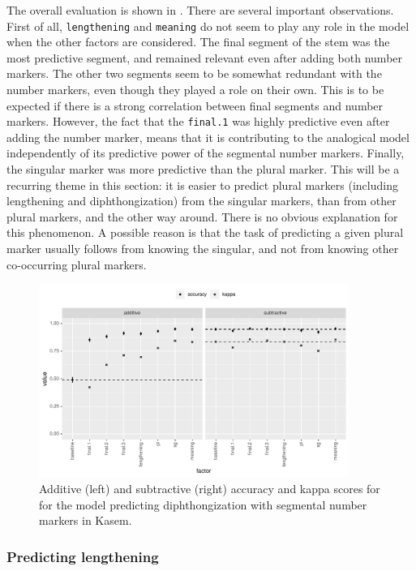 The overall evaluation is shown in . There are several important observations. First of all, \texttt{lengthening} and \texttt{meaning} do not seem to play any role in the model when the other factors are considered. The final segment of the stem was the most predictive segment, and remained relevant even after adding both number markers. The other two segments seem to be somewhat redundant with the number markers, even though they played a role on their own. This is to be expected if there is a strong correlation between final segments and number markers. However, the fact that the \texttt{final.1} was highly predictive even after adding the number marker, means that it is contributing to the analogical model independently of its predictive power of the segmental number markers. Finally, the singular marker was more predictive than the plural marker. This will be a recurring theme in this section: it is easier to predict plural markers (including lengthening and diphthongization) from the singular markers, than from other plural markers, and the other way around. There is no obvious explanation for this phenomenon. A possible reason is that the task of predicting a given plural marker usually follows from knowing the singular, and not from knowing other co-occurring plural markers.

\begin{figure}[!htpb]
  \centering
  \includegraphics[width=0.9\textwidth]{./figures/kasem/p-fi-dp-sg-overall.pdf}
  \caption{Additive (left) and subtractive (right) accuracy and kappa scores for for the model predicting diphthongization with segmental number markers in Kasem.}\label{fig:overall-fi-dp}
\end{figure}

\subsubsection{Predicting lengthening}\label{subsec:pred-length}

